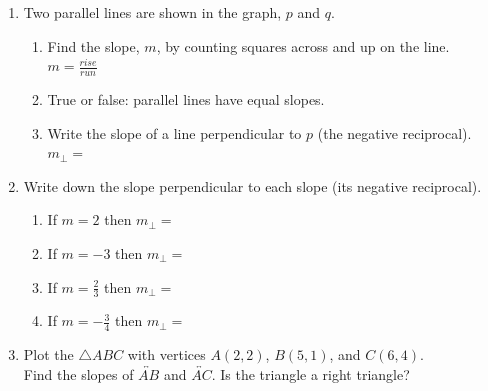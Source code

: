\documentclass[12pt, twoside]{article}
\begin{document}
\begin{enumerate}
\newpage
\item Two parallel lines are shown in the graph, $p$ and $q$.
\begin{multicols}{2}
    \begin{enumerate}[itemsep=1cm]
      \item Find the slope, $m$, by counting squares across and up on the line. \\[0.5cm]
      $\displaystyle m = \frac{rise}{run}$\\[0.5cm]
      \item True or false: parallel lines have equal slopes.
      \item Write the slope of a line perpendicular to $p$ (the negative reciprocal).\\[0.25cm]
      $m_{\perp}=$
      \end{enumerate}
    \begin{flushright}
    \end{flushright}
\end{multicols}

\newpage
\item Write down the slope perpendicular to each slope (its negative reciprocal).
\begin{enumerate}[itemsep=0.9cm]
  \item If $m = 2$ then $m_{\perp}=$
  \item If $m = -3$ then $m_{\perp}=$
  \item If $\displaystyle m = \frac{2}{3}$ then $m_{\perp}=$
  \item If $\displaystyle m = -\frac{3}{4}$ then $m_{\perp}=$
\end{enumerate}

\newpage
\item Plot the $\triangle ABC$ with vertices $A(2,2)$, $B(5,1)$, and $C(6,4)$. \\[0.5cm]
Find the slopes of $\overleftrightarrow{AB}$ and $\overleftrightarrow{AC}$. Is the triangle a right triangle?
  \begin{center}
    \end{center}


\end{enumerate}
\end{document}
